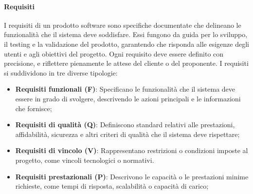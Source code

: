     \paragraph{Requisiti}
    I requisiti di un prodotto software sono specifiche documentate che delineano le funzionalità che il sistema deve soddisfare. Essi fungono da guida per lo sviluppo, il testing e la validazione del prodotto, garantendo che risponda alle esigenze degli utenti e agli obiettivi del progetto. Ogni requisito deve essere definito con precisione, e riflettere pienamente le attese del cliente o del proponente.\newline
    I requisiti si suddividono in tre diverse tipologie:
    \begin{itemize}
        \item \textbf{Requisiti funzionali (F)}: Specificano le funzionalità che il sistema deve essere in grado di svolgere, descrivendo le azioni principali e le informazioni che fornisce;
        \item \textbf{Requisiti di qualità (Q)}: Definiscono standard relativi alle prestazioni, affidabilità, sicurezza e altri criteri di qualità che il sistema deve rispettare;
        \item \textbf{Requisiti di vincolo (V)}: Rappresentano restrizioni o condizioni imposte al progetto, come vincoli tecnologici o normativi.
        \item \textbf{Requisiti prestazionali (P)}: Descrivono le capacità o le prestazioni minime richieste, come tempi di risposta, scalabilità o capacità di carico;
    \end{itemize}


